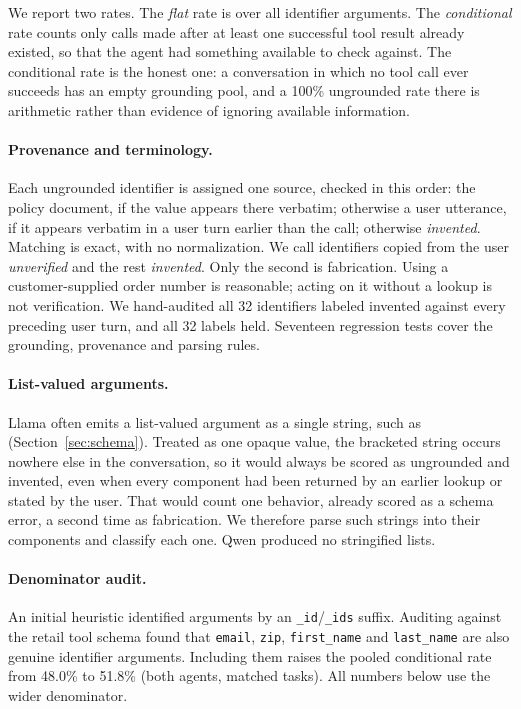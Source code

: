\documentclass{article}
\begin{document}
We report two rates. The \emph{flat} rate is over all identifier arguments. The \emph{conditional} rate counts only calls made after at least one successful tool result already existed, so that the agent had something available to check against. The conditional rate is the honest one: a conversation in which no tool call ever succeeds has an empty grounding pool, and a 100\% ungrounded rate there is arithmetic rather than evidence of ignoring available information.

\paragraph{Provenance and terminology.} Each ungrounded identifier is assigned one source, checked in this order: the policy document, if the value appears there verbatim; otherwise a user utterance, if it appears verbatim in a user turn earlier than the call; otherwise \emph{invented}. Matching is exact, with no normalization. We call identifiers copied from the user \emph{unverified} and the rest \emph{invented}. Only the second is fabrication. Using a customer-supplied order number is reasonable; acting on it without a lookup is not verification. We hand-audited all 32 identifiers labeled invented against every preceding user turn, and all 32 labels held. Seventeen regression tests cover the grounding, provenance and parsing rules.

\paragraph{List-valued arguments.} Llama often emits a list-valued argument as a single string, such as \texttt{\textquotesingle[1151293680, 4983901480]\textquotesingle} (Section~\ref{sec:schema}). Treated as one opaque value, the bracketed string occurs nowhere else in the conversation, so it would always be scored as ungrounded and invented, even when every component had been returned by an earlier lookup or stated by the user. That would count one behavior, already scored as a schema error, a second time as fabrication. We therefore parse such strings into their components and classify each one. Qwen produced no stringified lists.

\paragraph{Denominator audit.} An initial heuristic identified arguments by an \texttt{\_id}/\texttt{\_ids} suffix. Auditing against the retail tool schema found that \texttt{email}, \texttt{zip}, \texttt{first\_name} and \texttt{last\_name} are also genuine identifier arguments. Including them raises the pooled conditional rate from 48.0\% to 51.8\% (both agents, matched tasks). All numbers below use the wider denominator.
\end{document}

